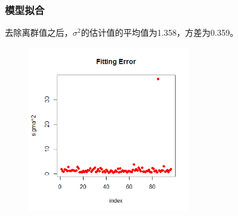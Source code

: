 \documentclass[11pt,compress,t, xcolor=table]{beamer}
\begin{document}
\begin{frame}
	\frametitle{模型拟合}
	去除离群值之后，$\sigma^2$的估计值的平均值为1.358，方差为0.359。
	
	\begin{figure}[H]
		\footnotesize
		\centering
		\includegraphics[width=7cm]{image/sigma2.png}
	\end{figure}
	
\end{frame}
\end{document}

